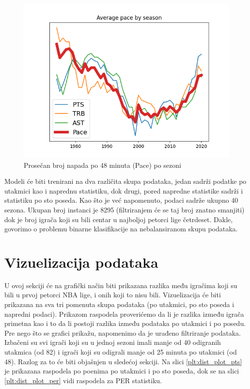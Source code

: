 \documentclass[a4paper]{article}
\begin{document}
\begin{figure}[h!]
\begin{center}
\includegraphics[scale=0.70]{pace_season.png}
\end{center}
\caption{Prosečan broj napada po 48 minuta (Pace) po sezoni}
\label{plt:pace_season}
\end{figure}

Modeli će biti trenirani na dva različita skupa podataka, jedan sadrži podatke po utakmici kao i naprednu statistiku, dok drugi, pored napredne statistike sadrži i statistiku po sto poseda. Kao što je već napomenuto, podaci sadrže ukupno 40 sezona. Ukupan broj instanci je 8295 (filtriranjem će se taj broj znatno smanjiti) dok je broj igrača koji su bili centar u najboljoj petorci lige četrdeset. Dakle, govorimo o problemu binarne klasifikacije na nebalansiranom skupu podataka.

\section{Vizuelizacija podataka}
\label{sec:vizuelizacija}

U ovoj sekciji će na grafički način biti prikazana razlika među igračima koji
su bili u prvoj petorci NBA lige, i onih koji to nisu bili. Vizuelizacija će biti
prikazana na sva tri pomenuta skupa podataka (po utakmici, po sto poseda i napredni podaci). Prikazom raspodela proverićemo da li je razlika između igrača primetna kao i to da li postoji razlika između podataka po utakmici i po posedu. Pre nego što se grafici prikažu, napomenimo da je urađeno filtriranje podataka. Izbačeni su svi igrači koji su u jednoj sezoni imali manje od 40 odigranih utakmica (od 82) i igrači koji su odigrali manje od 25 minuta po utakmici (od 48). Razlog za to će biti objašnjen u sledećoj sekciji. Na slici \ref{plt:dist_plot_pts} je prikazana raspodela po poenima po utakmici i po sto poseda, dok se na slici \ref{plt:dist_plot_per} vidi raspodela za PER statistiku.
\end{document}
